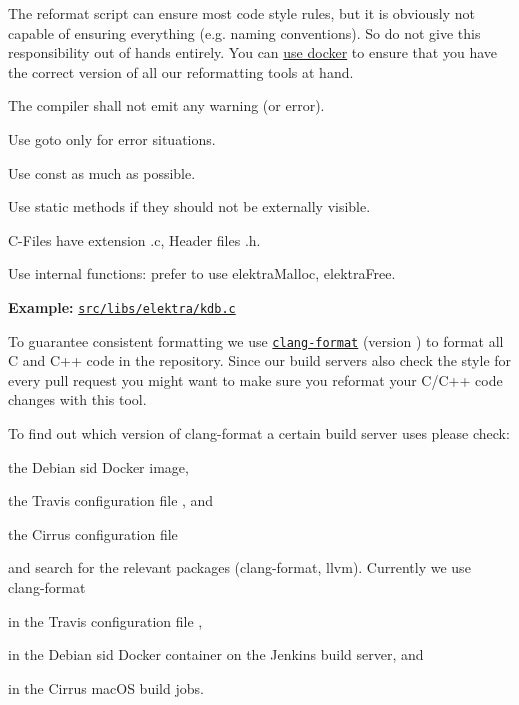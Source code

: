 The reformat script can ensure most code style rules, but it is obviously not capable of ensuring everything (e.\+g. naming conventions). So do not give this responsibility out of hands entirely. You can \hyperlink{doc_tutorials_run_reformatting_script_with_docker_md}{use docker} to ensure that you have the correct version of all our reformatting tools at hand.


\begin{DoxyItemize}
\item The compiler shall not emit any warning (or error).
\item Use goto only for error situations.
\item Use {\ttfamily const} as much as possible.
\item Use {\ttfamily static} methods if they should not be externally visible.
\item C-\/\+Files have extension {\ttfamily .c}, Header files {\ttfamily .h}.
\item Use internal functions\+: prefer to use {\ttfamily elektra\+Malloc}, {\ttfamily elektra\+Free}.
\end{DoxyItemize}

{\bfseries Example\+:} \href{/home/jenkins/workspace/libelektra-release/src/libs/elektra/kdb.c}{\tt src/libs/elektra/kdb.\+c}

To guarantee consistent formatting we use \href{https://clang.llvm.org/docs/ClangFormat.html}{\tt {\ttfamily clang-\/format}} (version {}) to format all C and C++ code in the repository. Since our build servers also check the style for every pull request you might want to make sure you reformat your C/\+C++ code changes with this tool.

To find out which version of {\ttfamily clang-\/format} a certain build server uses please check\+:


\begin{DoxyItemize}
\item the Debian sid Docker image,
\item the Travis configuration file , and
\item the Cirrus configuration file
\end{DoxyItemize}

and search for the relevant packages ({\ttfamily clang-\/format}, {\ttfamily llvm}). Currently we use clang-\/format {}


\begin{DoxyItemize}
\item in the Travis configuration file ,
\item in the Debian sid Docker container on the Jenkins build server, and
\item in the Cirrus mac\+OS build jobs.
\end{DoxyItemize}

